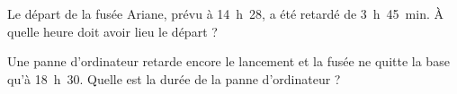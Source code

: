 \begin{myenumerate}
\item Le départ de la fusée Ariane, prévu à 14~h~28, a été retardé
 de 3~h~45~min. \`A quelle heure doit avoir lieu le départ ?
\item Une panne d'ordinateur retarde encore le lancement et la fusée
 ne quitte la base qu'à 18~h~30. Quelle est la durée de la panne
 d'ordinateur ?
\end{myenumerate}
